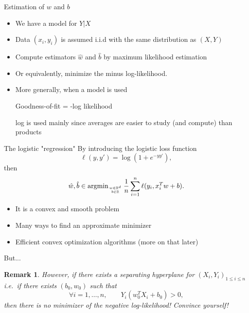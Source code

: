 \documentclass[xcolor={usenames,dvipsnames},handout]{beamer}
\newtheorem{remark}[theorem]{Remark}
\begin{document}
\begin{frame}{Estimation of $w$ and $b$}

\begin{itemize}
\item We have a model for $Y|X$
\item Data $(x_i , y_i)$ is assumed i.i.d with the same distribution as $(X,Y)$
\item Compute estimators $\hat{w}$ and $\hat{b}$ by maximum likelihood estimation
\item Or equivalently, minimize the minus log-likelihood.
\item  More generally, when a model is used
\begin{center}
Goodness-of-fit = -log likelihood
\end{center}
log is used mainly since averages are easier to study (and compute) than products
\end{itemize}  
\end{frame}


\begin{frame}{The logistic "regression"}
By introducing the logistic loss function
$$
\ell (y , y') = \log (1+e^{-yy'} ),
$$
then
$$
\hat{w}, \hat{b} \in \operatorname{argmin}_{w\in \mathbb{R}^d \atop b \in \mathbb{R}} \frac{1}{n} \sum_{i=1}^n \ell (y_i , x_i^T w+b).
$$

\begin{itemize}
\item It is a convex and smooth problem
\item Many ways to find an approximate minimizer 
\item Efficient convex optimization algorithms (more on that later)
\end{itemize}
\end{frame}

\begin{frame}{But...}
\begin{remark}
However, if there exists a separating hyperplane for $(X_i,Y_i)_{1\leq i \leq n}$ i.e.\ if there exists $(b_0,w_0)$ such that
$$
\forall i=1,\hdots , n , \qquad Y_i (w_0^T X_i +b_0) >0,
$$
then there is no minimizer of the negative log-likelihood! Convince yourself! 
\end{remark}
\end{frame}
\end{document}
